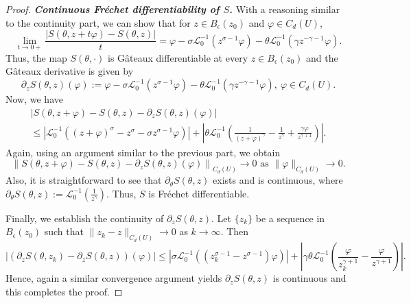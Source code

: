 \documentclass[reqno,oneside]{amsart}
\theoremstyle{definition}
\theoremstyle{remark}
\numberwithin{equation}{section}
\newcommand{\pa}{\partial}
\newcommand{\rar}{\rightarrow}
\newcommand{\si}{\sigma}
\newcommand{\ball}{B_{\epsilon} (z_0)}
\newcommand{\li}{\mathcal{L}_0^{-1}}
\begin{document}
\begin{proof}
    \noindent\textit{\textbf{Continuous Fr\'echet differentiability of $S$.}} With a reasoning similar to the continuity part, we can show that for $z\in \ball$ and $\varphi \in C_d (U)$,
    \[\lim_{t\rar 0+} \frac{|S(\theta, z + t \varphi) - S(\theta, z)|}{t} = \varphi - \si \li \left(z^{\si -1} \varphi \right) - \theta \li \left(\gamma z^{-\gamma -1} \varphi \right). \]
    Thus, the map $S(\theta, \cdot)$ is G\^ateaux differentiable at every $z\in \ball$ and the G\^ateaux derivative is given by
    \[\pa_z S(\theta, z)(\varphi):= \varphi - \si \li \left(z^{\si -1} \varphi \right) - \theta \li \left(\gamma z^{-\gamma -1} \varphi \right),\ \varphi \in C_d (U). \]
    Now, we have
    \begin{multline}\label{Frechet 1}
        |S(\theta, z+\varphi) - S(\theta, z) - \pa_z S(\theta, z)(\varphi)|\nonumber\\
        \leq \left|\li \left( (z+\varphi)^{\si} - z^{\si} - \si z^{\si -1} \varphi \right)\right| + \left| \theta \li \left( \frac{1}{(z+\varphi)^{\gamma}} - \frac{1}{z^{\gamma}} + \frac{\gamma \varphi}{z^{\gamma +1}} \right) \right|.
    \end{multline}
     Again, using an argument similar to the previous part, we obtain
     \[ \left\|S(\theta, z+\varphi) - S(\theta, z) - \pa_z S(\theta, z)(\varphi)\right\|_{C_d (U)} \rar 0 \text{ as } \|\varphi\|_{C_d (U)} \rar 0. \]
     Also, it is straightforward to see that $\pa_{\theta} S(\theta, z) $ exists and is continuous, where $\pa_{\theta} S(\theta, z):= \li \left( \frac{1}{z^{\gamma}} \right) $. Thus, $S$ is Fr\'echet differentiable.
     
     Finally, we establish the continuity of $\pa_z S(\theta, z)$. Let $\{z_k\}$ be a sequence in $\ball$ such that $\| z_k - z \|_{C_d (U)} \rar 0$ as $k\rar\infty$. Then
     \begin{equation}
         \left| \left(\pa_{z} S(\theta, z_k) - \pa_z S(\theta, z) \right) (\varphi) \right| \leq \left| \si \li \left( \left(z_k^{\si -1} - z^{\si -1}\right) \varphi \right) \right| + \left| \gamma \theta \li \left( \frac{\varphi}{z_k^{\gamma +1}} - \frac{\varphi}{z^{\gamma+1}} \right) \right|.
     \end{equation}
     Hence, again a similar convergence argument yields $\pa_z S(\theta, z)$ is continuous and this completes the proof.
\end{proof}
\end{document}
